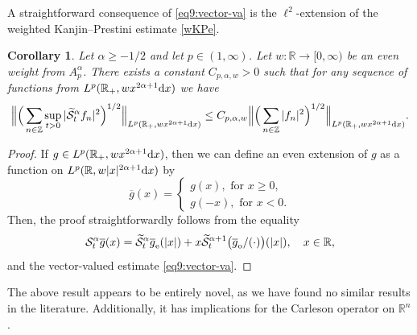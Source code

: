 \documentclass[11pt,oneside]{amsart}
\numberwithin{equation}{section}
\newtheorem{corollary}[equation]{Corollary}
\theoremstyle{definition}
\newcommand{\RR}{\mathbb{R}}
\newcommand{\ZZ}{\mathbb{Z}}
\newcommand{\calS}{\mathcal{S}}
\begin{document}
A straightforward consequence of \eqref{eq9:vector-va} is the $\ell^2$-extension of the weighted Kanjin--Prestini estimate \eqref{wKPe}.
\begin{corollary}\label{cor:hankelsum}
Let $\alpha\geq-1/2$ and let $p\in(1,\infty)$. Let $w\colon\RR\to[0,\infty)$ be an even weight from $A_p^\alpha$. There exists a constant $C_{p,\alpha,w}>0$ such that for any sequence of functions from $L^p(\RR_+,wx^{2\alpha+1}{\rm d}x)$ we have 
\begin{equation*}
    \Big\|\Big(\sum_{n\in\ZZ}\sup_{t>0} |\widetilde{\calS}_{t}^\alpha f_n|^2\Big)^{1/2}\Big\|_{L^p(\RR_+,wx^{2\alpha+1}{\rm d}x)}\leq C_{p,\alpha,w}\Big\|\Big(\sum_{n\in\ZZ}|f_n|^2\Big)^{1/2}\Big\|_{L^p(\RR_+,wx^{2\alpha+1}{\rm d}x)}.
\end{equation*}
\end{corollary}
\begin{proof}
If $g\in L^p(\RR_+,wx^{2\alpha+1}{\rm d}x)$, then we can define an even extension of $g$ as a function on $L^p(\RR,w|x|^{2\alpha+1}{\rm d}x)$ by
\begin{equation*}
    \overline{g}(x)=\begin{cases}
        g(x),\text{ for } x\geq 0,\\
        g(-x),\text{ for } x<0.
    \end{cases}
\end{equation*}
Then, the proof straightforwardly follows from the equality
\begin{equation*}
    {\calS}_{t}^\alpha \overline{g}(x)=\widetilde{\calS}_{t}^\alpha \overline{g}_{\rm e}(|x|)+x\widetilde{\calS}_{t}^{\alpha+1}\big(\overline{g}_{\rm o}/{(\cdot)}\big)(|x|),\quad x\in\RR,
\end{equation*}
and the vector-valued estimate \eqref{eq9:vector-va}.
\end{proof}
The above result appears to be entirely novel, as we have found no similar results in the literature. Additionally, it has implications for the Carleson operator on $\mathbb{R}^n$.
\end{document}
